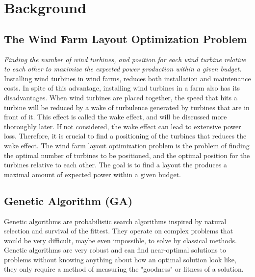 \chapter{Background}


\section{The Wind Farm Layout Optimization Problem}


\textit{Finding the number of wind turbines, and position for each wind turbine relative to each other to maximize the expected power production within a given budget.}\\


\noindent Installing wind turbines in wind farms, reduces both installation and maintenance costs. In spite of this advantage, installing wind turbines in a farm also has its disadvantages. When wind turbines are placed together, the speed that hits a turbine will be reduced by a wake of turbulence generated by turbines that are in front of it. This effect is called the wake effect, and will be discussed more thoroughly later. If not considered, the wake effect can lead to extensive power loss. Therefore, it is crucial to find a positioning of the turbines that reduces the wake effect. The wind farm layout optimization problem is the problem of finding the optimal number of turbines to be positioned, and the optimal position for the turbines relative to each other. The goal is to find a layout the produces a maximal amount of expected power within a given budget.


\section{Genetic Algorithm (GA)}




Genetic algorithms are probabilistic search algorithms inspired by natural selection and survival of the fittest. They operate on complex problems that would be very difficult, maybe even impossible, to solve by classical methods. Genetic algorithms are very robust and can find near-optimal solutions to problems without knowing anything about how an optimal solution look like, they only require a method of measuring the "goodness" or fitness of a solution.


